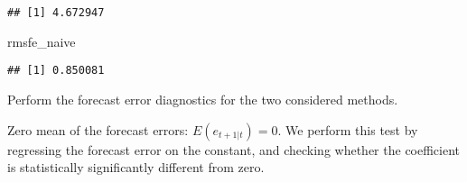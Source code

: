 \documentclass[
  oneside]{book}
\newenvironment{Shaded}{\begin{snugshade}}{\end{snugshade}}
\newcommand{\AttributeTok}[1]{\textcolor[rgb]{0.77,0.63,0.00}{#1}}
\newcommand{\DecValTok}[1]{\textcolor[rgb]{0.00,0.00,0.81}{#1}}
\newcommand{\FunctionTok}[1]{\textcolor[rgb]{0.00,0.00,0.00}{#1}}
\newcommand{\NormalTok}[1]{#1}
\newcommand{\OtherTok}[1]{\textcolor[rgb]{0.56,0.35,0.01}{#1}}
\newcommand{\SpecialCharTok}[1]{\textcolor[rgb]{0.00,0.00,0.00}{#1}}
\newcommand{\StringTok}[1]{\textcolor[rgb]{0.31,0.60,0.02}{#1}}
\begin{document}
\begin{Shaded}
\end{Shaded}

\begin{verbatim}
## [1] 4.672947
\end{verbatim}

\begin{Shaded}
\begin{Highlighting}[]
\NormalTok{rmsfe\_naive}
\end{Highlighting}
\end{Shaded}

\begin{verbatim}
## [1] 0.850081
\end{verbatim}

Perform the forecast error diagnostics for the two considered methods.

Zero mean of the forecast errors: \(E(e_{t+1|t})=0\).
We perform this test by regressing the forecast error on the constant, and checking whether the coefficient is statistically significantly different from zero.

\begin{Shaded}
\end{Shaded}
\end{document}
